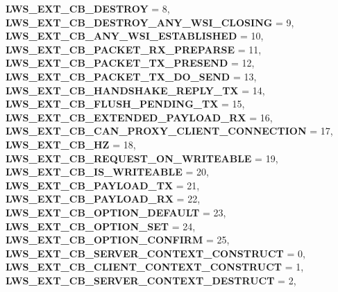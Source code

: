 \begin{DoxyCompactItemize}
\newline
{\bfseries L\+W\+S\+\_\+\+E\+X\+T\+\_\+\+C\+B\+\_\+\+D\+E\+S\+T\+R\+OY} = 8, 
{\bfseries L\+W\+S\+\_\+\+E\+X\+T\+\_\+\+C\+B\+\_\+\+D\+E\+S\+T\+R\+O\+Y\+\_\+\+A\+N\+Y\+\_\+\+W\+S\+I\+\_\+\+C\+L\+O\+S\+I\+NG} = 9, 
{\bfseries L\+W\+S\+\_\+\+E\+X\+T\+\_\+\+C\+B\+\_\+\+A\+N\+Y\+\_\+\+W\+S\+I\+\_\+\+E\+S\+T\+A\+B\+L\+I\+S\+H\+ED} = 10, 
{\bfseries L\+W\+S\+\_\+\+E\+X\+T\+\_\+\+C\+B\+\_\+\+P\+A\+C\+K\+E\+T\+\_\+\+R\+X\+\_\+\+P\+R\+E\+P\+A\+R\+SE} = 11, 
\newline
{\bfseries L\+W\+S\+\_\+\+E\+X\+T\+\_\+\+C\+B\+\_\+\+P\+A\+C\+K\+E\+T\+\_\+\+T\+X\+\_\+\+P\+R\+E\+S\+E\+ND} = 12, 
{\bfseries L\+W\+S\+\_\+\+E\+X\+T\+\_\+\+C\+B\+\_\+\+P\+A\+C\+K\+E\+T\+\_\+\+T\+X\+\_\+\+D\+O\+\_\+\+S\+E\+ND} = 13, 
{\bfseries L\+W\+S\+\_\+\+E\+X\+T\+\_\+\+C\+B\+\_\+\+H\+A\+N\+D\+S\+H\+A\+K\+E\+\_\+\+R\+E\+P\+L\+Y\+\_\+\+TX} = 14, 
{\bfseries L\+W\+S\+\_\+\+E\+X\+T\+\_\+\+C\+B\+\_\+\+F\+L\+U\+S\+H\+\_\+\+P\+E\+N\+D\+I\+N\+G\+\_\+\+TX} = 15, 
\newline
{\bfseries L\+W\+S\+\_\+\+E\+X\+T\+\_\+\+C\+B\+\_\+\+E\+X\+T\+E\+N\+D\+E\+D\+\_\+\+P\+A\+Y\+L\+O\+A\+D\+\_\+\+RX} = 16, 
{\bfseries L\+W\+S\+\_\+\+E\+X\+T\+\_\+\+C\+B\+\_\+\+C\+A\+N\+\_\+\+P\+R\+O\+X\+Y\+\_\+\+C\+L\+I\+E\+N\+T\+\_\+\+C\+O\+N\+N\+E\+C\+T\+I\+ON} = 17, 
{\bfseries L\+W\+S\+\_\+\+E\+X\+T\+\_\+\+C\+B\+\_\+HZ} = 18, 
{\bfseries L\+W\+S\+\_\+\+E\+X\+T\+\_\+\+C\+B\+\_\+\+R\+E\+Q\+U\+E\+S\+T\+\_\+\+O\+N\+\_\+\+W\+R\+I\+T\+E\+A\+B\+LE} = 19, 
\newline
{\bfseries L\+W\+S\+\_\+\+E\+X\+T\+\_\+\+C\+B\+\_\+\+I\+S\+\_\+\+W\+R\+I\+T\+E\+A\+B\+LE} = 20, 
{\bfseries L\+W\+S\+\_\+\+E\+X\+T\+\_\+\+C\+B\+\_\+\+P\+A\+Y\+L\+O\+A\+D\+\_\+\+TX} = 21, 
{\bfseries L\+W\+S\+\_\+\+E\+X\+T\+\_\+\+C\+B\+\_\+\+P\+A\+Y\+L\+O\+A\+D\+\_\+\+RX} = 22, 
{\bfseries L\+W\+S\+\_\+\+E\+X\+T\+\_\+\+C\+B\+\_\+\+O\+P\+T\+I\+O\+N\+\_\+\+D\+E\+F\+A\+U\+LT} = 23, 
\newline
{\bfseries L\+W\+S\+\_\+\+E\+X\+T\+\_\+\+C\+B\+\_\+\+O\+P\+T\+I\+O\+N\+\_\+\+S\+ET} = 24, 
{\bfseries L\+W\+S\+\_\+\+E\+X\+T\+\_\+\+C\+B\+\_\+\+O\+P\+T\+I\+O\+N\+\_\+\+C\+O\+N\+F\+I\+RM} = 25, 
{\bfseries L\+W\+S\+\_\+\+E\+X\+T\+\_\+\+C\+B\+\_\+\+S\+E\+R\+V\+E\+R\+\_\+\+C\+O\+N\+T\+E\+X\+T\+\_\+\+C\+O\+N\+S\+T\+R\+U\+CT} = 0, 
{\bfseries L\+W\+S\+\_\+\+E\+X\+T\+\_\+\+C\+B\+\_\+\+C\+L\+I\+E\+N\+T\+\_\+\+C\+O\+N\+T\+E\+X\+T\+\_\+\+C\+O\+N\+S\+T\+R\+U\+CT} = 1, 
\newline
{\bfseries L\+W\+S\+\_\+\+E\+X\+T\+\_\+\+C\+B\+\_\+\+S\+E\+R\+V\+E\+R\+\_\+\+C\+O\+N\+T\+E\+X\+T\+\_\+\+D\+E\+S\+T\+R\+U\+CT} = 2, 

\end{DoxyCompactItemize}
